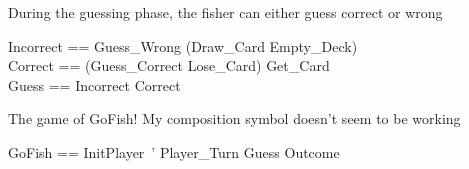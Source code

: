 \documentclass{article}
\begin{document}
During the guessing phase, the fisher can either guess correct or wrong
\begin{zed}
    Incorrect == Guess\_Wrong \land (Draw\_Card \lor Empty\_Deck)\\
    Correct == (Guess\_Correct \pipe Lose\_Card) \pipe Get\_Card \\
    Guess == Incorrect \lor Correct
\end{zed}

The game of GoFish! My composition symbol doesn't seem to be working
\begin{zed}
    GoFish == InitPlayer~' \semi Player\_Turn \semi Guess \lor Outcome\\
\end{zed}
    
\end{document}
